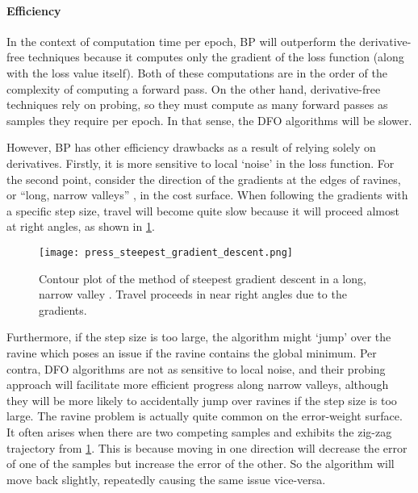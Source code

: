 \paragraph{Efficiency}
In the context of computation time per epoch, BP will outperform the derivative-free techniques because it computes only the gradient of the loss function (along with the loss value itself). 
Both of these computations are in the order of the complexity of computing a forward pass.
On the other hand, derivative-free techniques rely on probing, so they must compute as many forward passes as samples they require per epoch.
In that sense, the DFO algorithms will be slower.

However, BP has other efficiency drawbacks as a result of relying solely on derivatives.
Firstly, it is more sensitive to local `noise' in the loss function.
For the second point, consider the direction of the gradients at the edges of ravines, or ``long, narrow valleys'' \cite{press1992}, in the cost surface.
When following the gradients with a specific step size, travel will become quite slow because it will proceed almost at right angles, as shown in \ref{fig:gradient_descent_narrow_valley}.
\begin{figure}
    \texttt{[image: press\_steepest\_gradient\_descent.png]}
    \caption{Contour plot of the method of steepest gradient descent in a long, narrow valley \cite[421]{press1992}. Travel proceeds in near right angles due to the gradients.}
    \label{fig:gradient_descent_narrow_valley}
\end{figure}
Furthermore, if the step size is too large, the algorithm might `jump' over the ravine which poses an issue if the ravine contains the global minimum.
Per contra, DFO algorithms are not as sensitive to local noise, and their probing approach will facilitate more efficient progress along narrow valleys, although they will be more likely to accidentally jump over ravines if the step size is too large.
The ravine problem is actually quite common on the error-weight surface. 
It often arises when there are two competing samples and exhibits the zig-zag trajectory from \ref{fig:gradient_descent_narrow_valley}.
This is because moving in one direction will decrease the error of one of the samples but increase the error of the other.
So the algorithm will move back slightly, repeatedly causing the same issue vice-versa.

